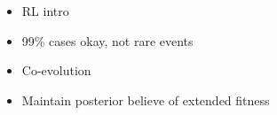 

\begin{itemize}
  \item{RL intro}
  \item{99\% cases okay, not rare events}
  \item{Co-evolution}
  \item{Maintain posterior believe of extended fitness}
\end{itemize}
